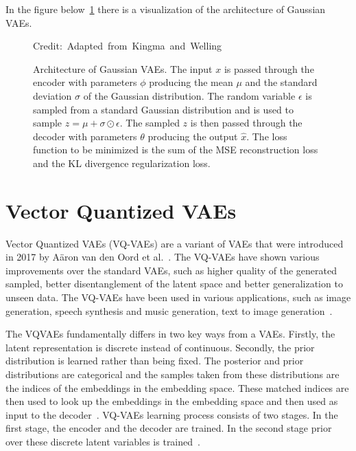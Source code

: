 In the figure below~\ref{VAEFigure} there is a visualization of the architecture of Gaussian VAEs.

\begin{figure}[H]
    \centering 
    
    \caption[Architecture of Gaussian VAEs.]%
    { Architecture of Gaussian VAEs. The input $x$ is passed through the encoder with parameters $\phi$ producing the mean $\mu$ and the standard deviation $\sigma$ of the Gaussian distribution. The random variable $\epsilon$ is sampled from a standard Gaussian distribution and is used to sample $ z = \mu + \sigma \odot \epsilon$. The sampled $z$ is then passed through the decoder with parameters $\theta$ producing the output $\hat{x}$. The loss function to be minimized is the sum of the MSE reconstruction loss and the KL divergence regularization loss. 
    }
  	\medskip 
	\hspace*{15pt}\hbox{\scriptsize Credit: Adapted from Kingma and Welling~\cite{Kingma_2019} }\label{VAEFigure}
\end{figure}

\section{Vector Quantized VAEs}

Vector Quantized VAEs (VQ-VAEs) are a variant of VAEs that were introduced in 2017 by Aäron van den Oord et al.~\cite{vqvae}. The VQ-VAEs have shown various improvements over the standard VAEs, such as higher quality of the generated sampled, better disentanglement of the latent space and better generalization to unseen data. The VQ-VAEs have been used in various applications, such as image generation, speech synthesis and music generation, text to image generation~\cite{vqvae2,vqvaespeechsynthesis, musicvqvae,dalle}.

The VQVAEs fundamentally differs in two key ways from a VAEs. Firstly, the latent representation is discrete instead of continuous. Secondly, the prior distribution is learned rather than being fixed. The posterior and prior distributions are categorical and the samples taken from these distributions are the indices of the embeddings in the embedding space. These matched indices are then used to look up the embeddings in the embedding space and then used as input to the decoder~\cite{vqvae}. VQ-VAEs learning
process consists of two stages. In the first stage, the encoder and the decoder are trained. In the second stage prior over these discrete latent variables is trained~\cite{vqvae}.


